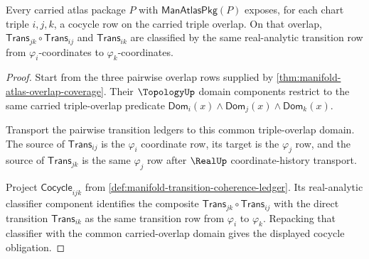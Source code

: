 \begin{theorem}
\label{thm:manifold-triple-overlap-cocycle}
Every carried atlas package $P$ with $\mathsf{ManAtlasPkg}(P)$ exposes, for
each chart triple $i,j,k$, a cocycle row on the carried triple overlap. On that
overlap, $\mathsf{Trans}_{jk}\circ\mathsf{Trans}_{ij}$ and
$\mathsf{Trans}_{ik}$ are classified by the same real-analytic transition row
from $\varphi_i$-coordinates to $\varphi_k$-coordinates.
\end{theorem}
\begin{proof}
Start from the three pairwise overlap rows supplied by
\autoref{thm:manifold-atlas-overlap-coverage}. Their $\TopologyUp$ domain
components restrict to the same carried triple-overlap predicate
$\mathsf{Dom}_i(x)\wedge\mathsf{Dom}_j(x)\wedge\mathsf{Dom}_k(x)$.

Transport the pairwise transition ledgers to this common triple-overlap
domain. The source of $\mathsf{Trans}_{ij}$ is the $\varphi_i$ coordinate row,
its target is the $\varphi_j$ row, and the source of $\mathsf{Trans}_{jk}$ is
the same $\varphi_j$ row after $\RealUp$ coordinate-history transport.

Project $\mathsf{Cocycle}_{ijk}$ from
\autoref{def:manifold-transition-coherence-ledger}. Its real-analytic
classifier component identifies the composite
$\mathsf{Trans}_{jk}\circ\mathsf{Trans}_{ij}$ with the direct transition
$\mathsf{Trans}_{ik}$ as the same transition row from $\varphi_i$ to
$\varphi_k$. Repacking that classifier with the common carried-overlap domain
gives the displayed cocycle obligation.
\end{proof}

